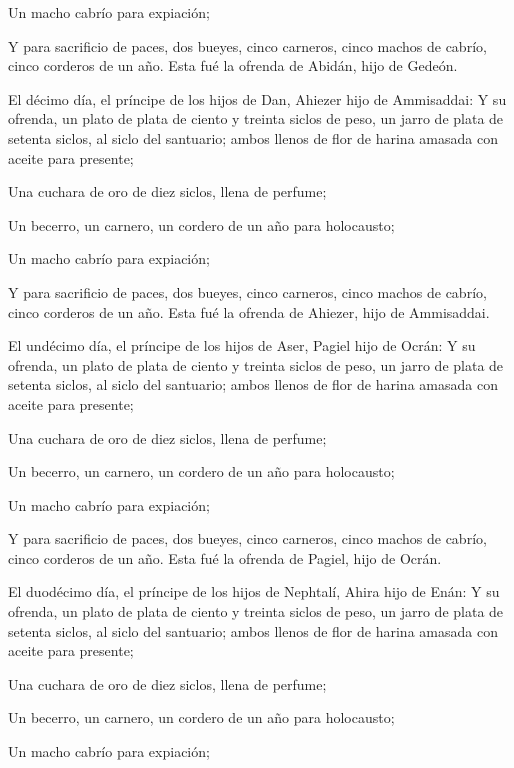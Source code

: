  Un macho cabrío para expiación;

 Y para sacrificio de paces, dos bueyes, cinco carneros,
cinco machos de cabrío, cinco corderos de un año. Esta fué la ofrenda de
Abidán, hijo de Gedeón.

 El décimo día, el príncipe de los hijos de Dan, Ahiezer
hijo de Ammisaddai:  Y su ofrenda, un plato de plata de
ciento y treinta siclos de peso, un jarro de plata de setenta siclos, al
siclo del santuario; ambos llenos de flor de harina amasada con aceite
para presente;

 Una cuchara de oro de diez siclos, llena de perfume;

 Un becerro, un carnero, un cordero de un año para
holocausto;

 Un macho cabrío para expiación;

 Y para sacrificio de paces, dos bueyes, cinco carneros,
cinco machos de cabrío, cinco corderos de un año. Esta fué la ofrenda de
Ahiezer, hijo de Ammisaddai.

 El undécimo día, el príncipe de los hijos de Aser, Pagiel
hijo de Ocrán:  Y su ofrenda, un plato de plata de ciento y
treinta siclos de peso, un jarro de plata de setenta siclos, al siclo
del santuario; ambos llenos de flor de harina amasada con aceite para
presente;

 Una cuchara de oro de diez siclos, llena de perfume;

 Un becerro, un carnero, un cordero de un año para
holocausto;

 Un macho cabrío para expiación;

 Y para sacrificio de paces, dos bueyes, cinco carneros,
cinco machos de cabrío, cinco corderos de un año. Esta fué la ofrenda de
Pagiel, hijo de Ocrán.

 El duodécimo día, el príncipe de los hijos de Nephtalí,
Ahira hijo de Enán:  Y su ofrenda, un plato de plata de
ciento y treinta siclos de peso, un jarro de plata de setenta siclos, al
siclo del santuario; ambos llenos de flor de harina amasada con aceite
para presente;

 Una cuchara de oro de diez siclos, llena de perfume;

 Un becerro, un carnero, un cordero de un año para
holocausto;

 Un macho cabrío para expiación;

